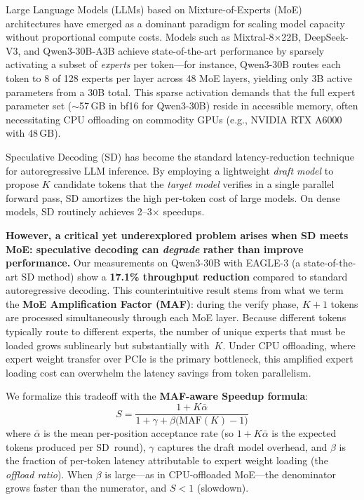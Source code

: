 \documentclass[letterpaper,twocolumn,10pt]{article}
\newcommand{\thetabar}{\bar{\alpha}}
\begin{document}
Large Language Models (LLMs) based on Mixture-of-Experts (MoE)
architectures have emerged as a dominant paradigm for scaling model
capacity without proportional compute costs.  Models such as
Mixtral-8$\times$22B, DeepSeek-V3, and Qwen3-30B-A3B achieve
state-of-the-art performance by sparsely activating a subset of
\emph{experts} per token---for instance, Qwen3-30B routes each token to 8
of 128 experts per layer across 48 MoE layers, yielding only 3B active
parameters from a 30B total.  This sparse activation demands that the full
expert parameter set (${\sim}$57\,GB in bf16 for Qwen3-30B) reside in
accessible memory, often necessitating CPU offloading on commodity GPUs
(e.g., NVIDIA RTX A6000 with 48\,GB).

Speculative Decoding (SD) has become the standard latency-reduction
technique for autoregressive LLM inference.  By employing a lightweight
\emph{draft model} to propose $K$ candidate tokens that the \emph{target
model} verifies in a single parallel forward pass, SD amortizes the high
per-token cost of large models.  On dense models, SD routinely achieves
2--3$\times$ speedups.

\textbf{However, a critical yet underexplored problem arises when SD meets
MoE: speculative decoding can \emph{degrade} rather than improve
performance.}  Our measurements on Qwen3-30B with EAGLE-3 (a
state-of-the-art SD method) show a \textbf{17.1\% throughput reduction}
compared to standard autoregressive decoding.  This counterintuitive
result stems from what we term the \textbf{MoE Amplification Factor
(MAF)}: during the verify phase, $K\!+\!1$ tokens are processed
simultaneously through each MoE layer.  Because different tokens typically
route to different experts, the number of unique experts that must be
loaded grows sublinearly but substantially with~$K$.  Under CPU
offloading, where expert weight transfer over PCIe is the primary
bottleneck, this amplified expert loading cost can overwhelm the latency
savings from token parallelism.

We formalize this tradeoff with the \textbf{MAF-aware Speedup formula}:
\begin{equation}\label{eq:speedup}
  S = \frac{1 + K\thetabar}{1 + \gamma + \beta\bigl(\text{MAF}(K) - 1\bigr)}
\end{equation}
where $\thetabar$ is the mean per-position acceptance rate (so
$1\!+\!K\thetabar$ is the expected tokens produced per SD~round),
$\gamma$ captures the draft model overhead, and $\beta$ is the
fraction of per-token latency attributable to expert weight loading
(the \emph{offload ratio}).  When $\beta$ is large---as in
CPU-offloaded MoE---the denominator grows faster than the numerator,
and $S < 1$ (slowdown).
\end{document}
